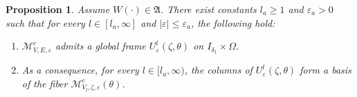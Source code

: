 \documentclass[reqno,11pt]{amsart}
\newtheorem{proposition}{Proposition}[section]
\begin{document}
\begin{proposition}\label{thm:sec8-final}
Assume $W(\cdot) \in \mathfrak A$. There exist constants $l_a \ge 1$ and $\varepsilon_a > 0$ such that for every $l \in [l_a, \infty]$ and $|\varepsilon| \le \varepsilon_a$, the following hold:
\begin{enumerate}
    \item $\boldsymbol{\mathcal M}^c_{V,E,\varepsilon}$ admits a global frame
    $
    U^l_\varepsilon(\zeta,\theta)
    $
    on $I_{\delta_1} \times \Omega$.
    \item As a consequence,  for every $l \in [l_a,\infty)$, the columns of $U^l_\varepsilon(\zeta,\theta)$ form a basis of the fiber $\mathcal{M}^c_{V_l,\zeta,\varepsilon}(\theta)$.
\end{enumerate}
\end{proposition}
\end{document}
